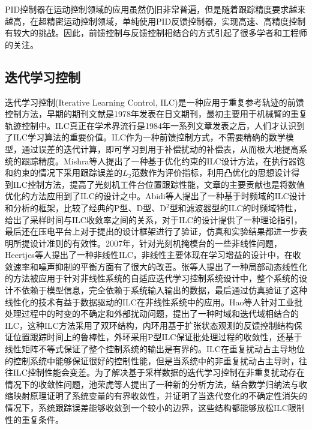 PID控制器在运动控制领域的应用虽然仍旧非常普遍，但是随着跟踪精度要求越来越高，在超精密运动控制领域，单纯使用PID反馈控制器，实现高速、高精度控制有较大的挑战。因此，前馈控制与反馈控制相结合的方式引起了很多学者和工程师的关注。
\subsection{迭代学习控制}
迭代学习控制(Iterative Learning Control, ILC)是一种应用于重复参考轨迹的前馈控制方法，早期的期刊文献是1978年发表在日文期刊\cite{uchiyama1978formation}，最初主要用于机械臂的重复轨迹控制中。ILC真正在学术界流行是1984年一系列文章\cite{1998Adaptive,kawamura1984iterative}发表之后，人们才认识到了ILC学习算法的重要价值。ILC作为一种前馈控制方式，不需要精确的数学模型，通过误差的迭代计算，即可学习到用于补偿扰动的补偿表，从而极大地提高系统的跟踪精度。Mishra等人\cite{mishra2010optimization}提出了一种基于优化约束的ILC设计方法，在执行器饱和约束的情况下采用跟踪误差的$L_2$范数作为评价指标，利用凸优化的思想设计得到ILC控制方法，提高了光刻机工件台位置跟踪性能，文章的主要贡献也是将数值优化的方法应用到了ILC的设计之中。Abidi等人\cite{abidi2010iterative}提出了一种基于时频域的ILC设计和分析的框架，比较了经典的P型、D型、D$^2$型和滤波器型的ILC的时频域特性，给出了采样时间与ILC收敛率之间的关系，对于ILC的设计提供了一种理论指引，最后还在压电平台上对于提出的设计框架进行了验证，仿真和实验结果都进一步表明所提设计准则的有效性。2007年，针对光刻机掩模台的一些非线性问题，Heertjes等人\cite{heertjes2007nonlinear}提出了一种非线性ILC，非线性主要体现在学习增益的设计中，在收敛速率和噪声抑制的平衡方面有了很大的改善。张等人\cite{zhang2018data}提出了一种局部动态线性化的方法被应用于针对非线性系统的自适应迭代学习控制系统设计中，整个系统的设计不依赖于模型信息，完全依赖于系统输入输出的数据，最后通过仿真验证了这种线性化的技术有益于数据驱动的ILC在非线性系统中的应用。Hao等人\cite{hao2020extended}针对工业批处理过程中的时变的不确定和外部扰动问题，提出了一种时域和迭代域相结合的ILC，这种ILC方法采用了双环结构，内环用基于扩张状态观测的反馈控制结构保证位置跟踪时间上的鲁棒性，外环采用P型ILC保证批处理过程的收敛性，还基于线性矩阵不等式保证了整个控制系统的输出是有界的。ILC在重复扰动占主导地位的控制系统中能够保证很好的控制性能，但是当系统中的非重复扰动占主导时，往往ILC控制性能会变差\cite{mishra2007precision}。为了解决基于采样数据的迭代学习控制在非重复扰动存在情况下的收敛性问题，池荣虎等人\cite{chi2020convergence}提出了一种新的分析方法，结合数学归纳法与收缩映射原理证明了系统变量的有界收敛性，并证明了当迭代变化的不确定性消失的情况下，系统跟踪误差能够收敛到一个较小的边界，这些结构都能够放松ILC限制性的重复条件。

